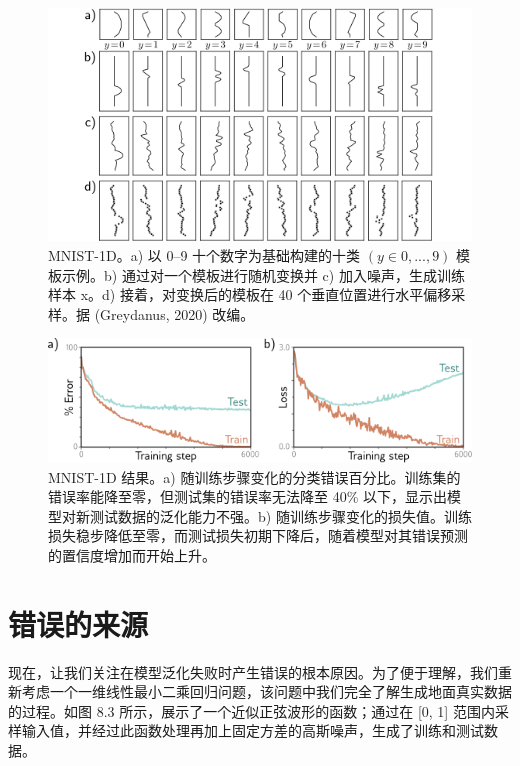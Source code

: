 \begin{figure}[ht!]
\centering
\includegraphics[width=0.7\linewidth]{png/chapter8/PerfMNIST1D.png}
\caption{MNIST-1D。a) 以 0–9 十个数字为基础构建的十类 \((y \in {0, . . . , 9})\) 模板示例。b) 通过对一个模板进行随机变换并 c) 加入噪声，生成训练样本 x。d) 接着，对变换后的模板在 40 个垂直位置进行水平偏移采样。据 (Greydanus, 2020) 改编。}
\end{figure}


\begin{figure}[ht!]
\centering
\includegraphics[width=0.7\linewidth]{png/chapter8/PerfMNIST1DResults.png}
\caption{MNIST-1D 结果。a) 随训练步骤变化的分类错误百分比。训练集的错误率能降至零，但测试集的错误率无法降至 40\% 以下，显示出模型对新测试数据的泛化能力不强。b) 随训练步骤变化的损失值。训练损失稳步降低至零，而测试损失初期下降后，随着模型对其错误预测的置信度增加而开始上升。}
\end{figure}

\section{错误的来源}
现在，让我们关注在模型泛化失败时产生错误的根本原因。为了便于理解，我们重新考虑一个一维线性最小二乘回归问题，该问题中我们完全了解生成地面真实数据的过程。如图 8.3 所示，展示了一个近似正弦波形的函数；通过在 [0, 1] 范围内采样输入值，并经过此函数处理再加上固定方差的高斯噪声，生成了训练和测试数据。

